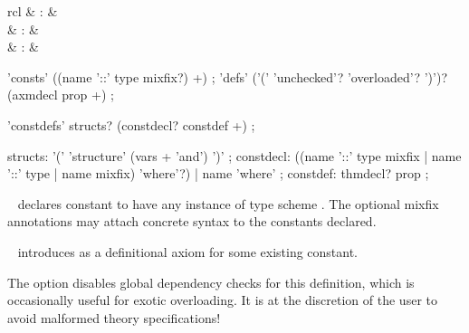 \begin{isabellebody}
\begin{isamarkuptext}
  \begin{matharray}{rcl}
    \hypertarget{command.consts}{\hyperlink{command.consts}{\mbox{}}} & : &  \\
    \hypertarget{command.defs}{\hyperlink{command.defs}{\mbox{}}} & : &  \\
    \hypertarget{command.constdefs}{\hyperlink{command.constdefs}{\mbox{}}} & : &  \\
  \end{matharray}

  \begin{rail}
    'consts' ((name '::' type mixfix?) +)
    ;
    'defs' ('(' 'unchecked'? 'overloaded'? ')')? \\ (axmdecl prop +)
    ;
  \end{rail}

  \begin{rail}
    'constdefs' structs? (constdecl? constdef +)
    ;

    structs: '(' 'structure' (vars + 'and') ')'
    ;
    constdecl:  ((name '::' type mixfix | name '::' type | name mixfix) 'where'?) | name 'where'
    ;
    constdef: thmdecl? prop
    ;
  \end{rail}

  \begin{description}

  \item \hyperlink{command.consts}{\mbox{}}~ declares constant  to have any instance of type scheme \isa{{\isasymsigma}}.  The optional
  mixfix annotations may attach concrete syntax to the constants
  declared.
  
  \item \hyperlink{command.defs}{\mbox{}}~ introduces 
  as a definitional axiom for some existing constant.
  
  The  option disables global dependency checks
  for this definition, which is occasionally useful for exotic
  overloading.  It is at the discretion of the user to avoid malformed
  theory specifications!
  

\end{description}
\end{isamarkuptext}
\end{isabellebody}
